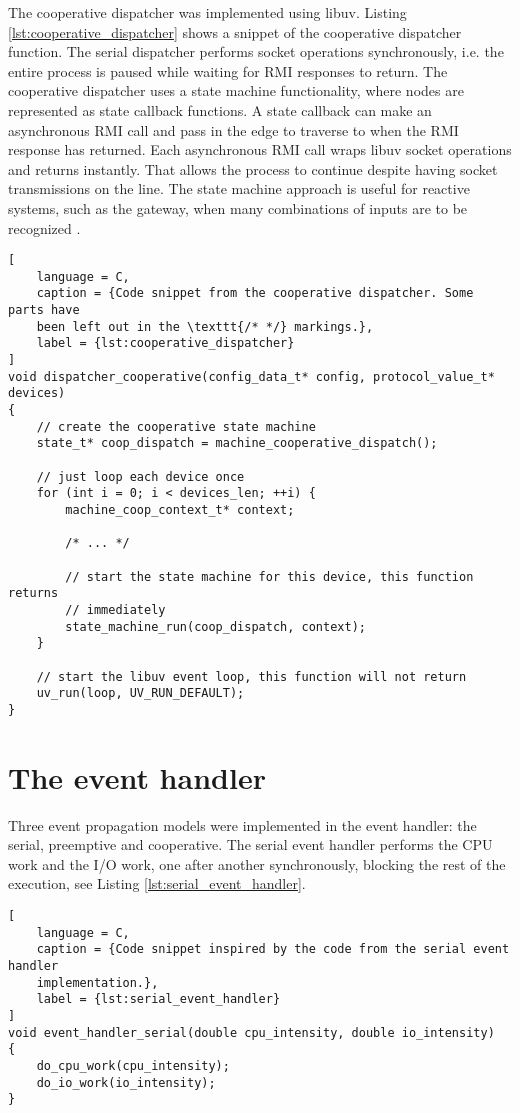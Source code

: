 The cooperative dispatcher was implemented using libuv. Listing
\ref{lst:cooperative_dispatcher} shows a snippet of the cooperative dispatcher
function. The serial dispatcher performs socket operations synchronously, i.e.
the entire process is paused while waiting for RMI responses to return. The
cooperative dispatcher uses a state machine functionality, where nodes are
represented as state callback functions. A state callback can make an
asynchronous RMI call and pass in the edge to traverse to when the RMI response
has returned. Each asynchronous RMI call wraps libuv socket operations and
returns instantly. That allows the process to continue despite having socket
transmissions on the line. The state machine approach is useful for reactive
systems, such as the gateway, when many combinations of inputs are to be
recognized \cite{harel1985development}.

\begin{lstlisting}[
    language = C,
    caption = {Code snippet from the cooperative dispatcher. Some parts have
    been left out in the \texttt{/* */} markings.},
    label = {lst:cooperative_dispatcher}
]
void dispatcher_cooperative(config_data_t* config, protocol_value_t* devices)
{
    // create the cooperative state machine
    state_t* coop_dispatch = machine_cooperative_dispatch();

    // just loop each device once
    for (int i = 0; i < devices_len; ++i) {
        machine_coop_context_t* context;

        /* ... */

        // start the state machine for this device, this function returns
        // immediately
        state_machine_run(coop_dispatch, context);
    }

    // start the libuv event loop, this function will not return
    uv_run(loop, UV_RUN_DEFAULT);
}
\end{lstlisting}

\section{The event handler}
\label{sec:impl_event_handler}

Three event propagation models were implemented in the event handler: the
serial, preemptive and cooperative. The serial event handler performs the CPU
work and the I/O work, one after another synchronously, blocking the rest of the
execution, see Listing \ref{lst:serial_event_handler}.

\begin{lstlisting}[
    language = C,
    caption = {Code snippet inspired by the code from the serial event handler
    implementation.},
    label = {lst:serial_event_handler}
]
void event_handler_serial(double cpu_intensity, double io_intensity)
{
    do_cpu_work(cpu_intensity);
    do_io_work(io_intensity);
}
\end{lstlisting}

